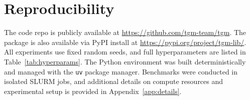 \section*{Reproducibility}

The \name code repo is publicly available at \url{https://github.com/tgm-team/tgm}. The package is also available via PyPI install at \url{https://pypi.org/project/tgm-lib/}. All experiments use fixed random seeds, and full hyperparameters are listed in Table~\ref{tab:hyperparams}. The Python environment was built deterministically and managed with the \texttt{uv} package manager. Benchmarks were conducted in isolated SLURM jobs, and additional details on compute resources and experimental setup is provided in Appendix~\ref{app:details}.